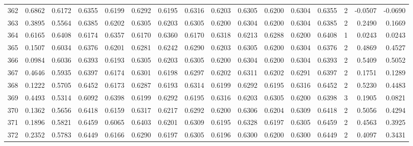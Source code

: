 \begin{tabular}{lrrrrrrrrrrrrrrr}
362 &      0.6862 &  0.6172 &  0.6355 &  0.6199 &  0.6292 &  0.6195 &  0.6316 &  0.6203 &  0.6305 &  0.6200 &   0.6304 &     0.6355 &      2 &                   -0.0507 &                    -0.0690 \\
363 &      0.3895 &  0.5564 &  0.6385 &  0.6202 &  0.6305 &  0.6203 &  0.6305 &  0.6200 &  0.6304 &  0.6200 &   0.6304 &     0.6385 &      2 &                    0.2490 &                     0.1669 \\
364 &      0.6165 &  0.6408 &  0.6174 &  0.6357 &  0.6170 &  0.6360 &  0.6170 &  0.6318 &  0.6213 &  0.6288 &   0.6200 &     0.6408 &      1 &                    0.0243 &                     0.0243 \\
365 &      0.1507 &  0.6034 &  0.6376 &  0.6201 &  0.6281 &  0.6242 &  0.6290 &  0.6203 &  0.6305 &  0.6200 &   0.6304 &     0.6376 &      2 &                    0.4869 &                     0.4527 \\
366 &      0.0984 &  0.6036 &  0.6393 &  0.6193 &  0.6305 &  0.6203 &  0.6305 &  0.6200 &  0.6304 &  0.6200 &   0.6304 &     0.6393 &      2 &                    0.5409 &                     0.5052 \\
367 &      0.4646 &  0.5935 &  0.6397 &  0.6174 &  0.6301 &  0.6198 &  0.6297 &  0.6202 &  0.6311 &  0.6202 &   0.6291 &     0.6397 &      2 &                    0.1751 &                     0.1289 \\
368 &      0.1222 &  0.5705 &  0.6452 &  0.6173 &  0.6287 &  0.6193 &  0.6314 &  0.6199 &  0.6292 &  0.6195 &   0.6316 &     0.6452 &      2 &                    0.5230 &                     0.4483 \\
369 &      0.4493 &  0.5314 &  0.6092 &  0.6398 &  0.6199 &  0.6292 &  0.6195 &  0.6316 &  0.6203 &  0.6305 &   0.6200 &     0.6398 &      3 &                    0.1905 &                     0.0821 \\
370 &      0.1362 &  0.5656 &  0.6418 &  0.6159 &  0.6317 &  0.6217 &  0.6292 &  0.6200 &  0.6306 &  0.6204 &   0.6309 &     0.6418 &      2 &                    0.5056 &                     0.4294 \\
371 &      0.1896 &  0.5821 &  0.6459 &  0.6065 &  0.6403 &  0.6201 &  0.6309 &  0.6195 &  0.6328 &  0.6197 &   0.6305 &     0.6459 &      2 &                    0.4563 &                     0.3925 \\
372 &      0.2352 &  0.5783 &  0.6449 &  0.6166 &  0.6290 &  0.6197 &  0.6305 &  0.6196 &  0.6300 &  0.6200 &   0.6300 &     0.6449 &      2 &                    0.4097 &                     0.3431 \\

\end{tabular}
